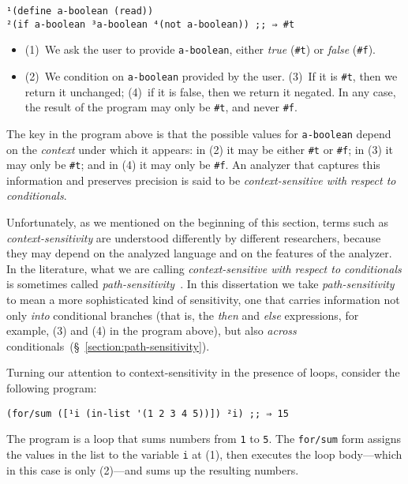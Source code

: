 \documentclass[12pt, oneside]{book}
\begin{document}
\begin{Verbatim}
¹(define a-boolean (read))
²(if a-boolean ³a-boolean ⁴(not a-boolean)) ;; ⇒ #t
\end{Verbatim}

\begin{itemize}
  \item (1)~We ask the user to provide \texttt{a-boolean}, either \emph{true} (\texttt{\#t}) or \emph{false} (\texttt{\#f}).
  \item (2)~We condition on \texttt{a-boolean} provided by the user. (3)~If it is \texttt{\#t}, then we return it unchanged; (4)~if it is false, then we return it negated. In any case, the result of the program may only be \texttt{\#t}, and never \texttt{\#f}.
\end{itemize}

The key in the program above is that the possible values for \texttt{a-boolean} depend on the \emph{context} under which it appears: in (2) it may be either \texttt{\#t} or \texttt{\#f}; in (3) it may only be \texttt{\#t}; and in (4) it may only be \texttt{\#f}. An analyzer that captures this information and preserves precision is said to be \emph{context-sensitive with respect to conditionals}.

Unfortunately, as we mentioned on the beginning of this section, terms such as \emph{context-sensitivity} are understood differently by different researchers, because they may depend on the analyzed language and on the features of the analyzer. In the literature, what we are calling \emph{context-sensitive with respect to conditionals} is sometimes called \emph{path-sensitivity}~\cite{ecoop-16}. In this dissertation we take \emph{path-sensitivity} to mean a more sophisticated kind of sensitivity, one that carries information not only \emph{into} conditional branches (that is, the \emph{then} and \emph{else} expressions, for example, (3) and (4) in the program above), but also \emph{across} conditionals~(§~\ref{section:path-sensitivity}).

Turning our attention to context-sensitivity in the presence of loops, consider the following program:

\begin{Verbatim}
(for/sum ([¹i (in-list '(1 2 3 4 5))]) ²i) ;; ⇒ 15
\end{Verbatim}

The program is a loop that sums numbers from \texttt{1} to \texttt{5}. The \texttt{for/sum} form assigns the values in the list to the variable \texttt{i} at (1), then executes the loop body—which in this case is only (2)—and sums up the resulting numbers.
\end{document}
